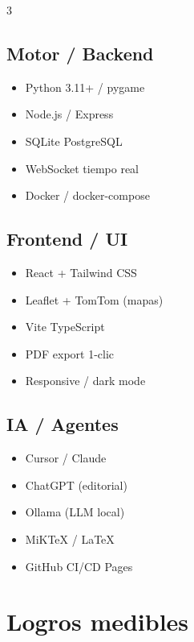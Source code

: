 \documentclass[10pt,a4paper]{article}
\begin{document}
\begin{multicols}{3}
\subsection*{Motor / Backend}
\begin{itemize}[leftmargin=1em, itemsep=1pt, topsep=1pt]
  \item Python 3.11+ / pygame
  \item Node.js / Express
  \item SQLite \textperiodcentered{} PostgreSQL
  \item WebSocket tiempo real
  \item Docker / docker-compose
\end{itemize}

\columnbreak
\subsection*{Frontend / UI}
\begin{itemize}[leftmargin=1em, itemsep=1pt, topsep=1pt]
  \item React + Tailwind CSS
  \item Leaflet + TomTom (mapas)
  \item Vite \textperiodcentered{} TypeScript
  \item PDF export 1-clic
  \item Responsive / dark mode
\end{itemize}

\columnbreak
\subsection*{IA / Agentes}
\begin{itemize}[leftmargin=1em, itemsep=1pt, topsep=1pt]
  \item Cursor / Claude
  \item ChatGPT (editorial)
  \item Ollama (LLM local)
  \item MiKTeX / \LaTeX{}
  \item GitHub CI/CD Pages
\end{itemize}
\end{multicols}

\section{Logros medibles}
\end{document}
